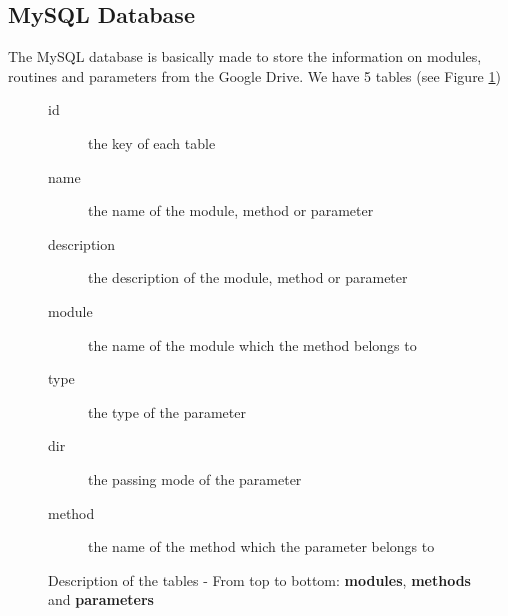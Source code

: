 \subsection{MySQL Database\label{data}}
The MySQL database is basically made to store the information on modules, routines and parameters from the Google Drive. We have 5 tables (see Figure \ref{table})
\begin{figure}[h!]
\begin{minipage}{0.45\textwidth}
\centering
{}
\end{minipage}
\hfill
\begin{minipage}{0.5\textwidth}
\footnotesize
\begin{description}
\item[id] the key of each table
\item[name] the name of the module, method or parameter
\item[description] the description of the module, method or parameter
\item[module] the name of the module which the method belongs to
\item[type] the type of the parameter
\item[dir] the passing mode of the parameter
\item[method] the name of the method which the parameter belongs to
\end{description}
\end{minipage}
\caption{Description of the tables - From top to bottom: \textbf{modules}, \textbf{methods} and \textbf{parameters}\label{table}}
\end{figure}
